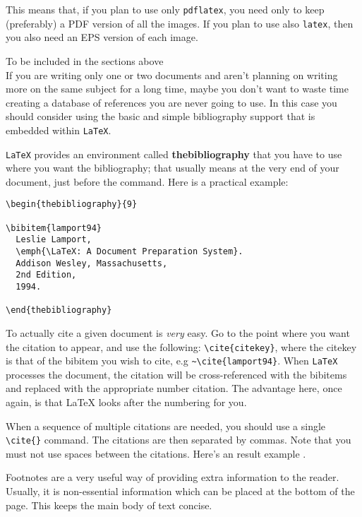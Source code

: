 This means that, if you plan to use only \verb!pdflatex!, you need only to keep (preferably) a PDF version of all the images. If you plan to use also \verb!latex!, then you also need an EPS version of each image.



\newpage

{\Large To be included in the sections above} \\

If you are writing only one or two documents and aren't planning on writing more on the same subject for a long time, maybe you don't want to waste time creating a database of references you are never going to use. In this case you should consider using the basic and simple bibliography support that is embedded within \texttt{LaTeX}.

\texttt{LaTeX} provides an environment called \textbf{thebibliography} that you have to use where you want the bibliography; that usually means at the very end of your document, just before the \verb!! command. Here is a practical example:

\begin{verbatim}
\begin{thebibliography}{9}

\bibitem{lamport94}
  Leslie Lamport,
  \emph{\LaTeX: A Document Preparation System}.
  Addison Wesley, Massachusetts,
  2nd Edition,
  1994.

\end{thebibliography}
\end{verbatim}

To actually cite a given document is \textit{very} easy. Go to the point where you want the citation to appear, and use the following: \verb!\cite{citekey}!, where the citekey is that of the bibitem you wish to cite, e.g \verb!~\cite{lamport94}!.  When \texttt{LaTeX} processes the document, the citation will be cross-referenced with the bibitems and replaced with the appropriate number citation. The advantage here, once again, is that LaTeX looks after the numbering for you.

When a sequence of multiple citations are needed, you should use a single \verb!\cite{}! command. The citations are then separated by commas. Note that you must not use spaces between the citations. Here's an result example \cite{strunk,chicago,texbook}.

Footnotes are a very useful way of providing extra information to the reader. Usually, it is non-essential information which can be placed at the bottom of the page. This keeps the main body of text concise.

